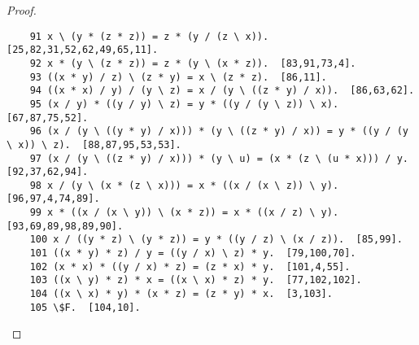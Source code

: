 \documentclass[12pt, twoside, openright]{report}
\theoremstyle{definition}
\begin{document}
\begin{proof}
\begin{lstlisting}
  	91 x \ (y * (z * z)) = z * (y / (z \ x)).  [25,82,31,52,62,49,65,11].
  	92 x * (y \ (z * z)) = z * (y \ (x * z)).  [83,91,73,4].
  	93 ((x * y) / z) \ (z * y) = x \ (z * z).  [86,11].
  	94 ((x * x) / y) / (y \ z) = x / (y \ ((z * y) / x)).  [86,63,62].
  	95 (x / y) * ((y / y) \ z) = y * ((y / (y \ z)) \ x).  [67,87,75,52].
  	96 (x / (y \ ((y * y) / x))) * (y \ ((z * y) / x)) = y * ((y / (y \ x)) \ z).  [88,87,95,53,53].
  	97 (x / (y \ ((z * y) / x))) * (y \ u) = (x * (z \ (u * x))) / y.  [92,37,62,94].
  	98 x / (y \ (x * (z \ x))) = x * ((x / (x \ z)) \ y).  [96,97,4,74,89].
  	99 x * ((x / (x \ y)) \ (x * z)) = x * ((x / z) \ y).  [93,69,89,98,89,90].
  	100 x / ((y * z) \ (y * z)) = y * ((y / z) \ (x / z)).  [85,99].
  	101 ((x * y) * z) / y = ((y / x) \ z) * y.  [79,100,70].
  	102 (x * x) * ((y / x) * z) = (z * x) * y.  [101,4,55].
  	103 ((x \ y) * z) * x = ((x \ x) * z) * y.  [77,102,102].
  	104 ((x \ x) * y) * (x * z) = (z * y) * x.  [3,103].
  	105 \$F.  [104,10].
  \end{lstlisting}


\end{proof}
\end{document}
